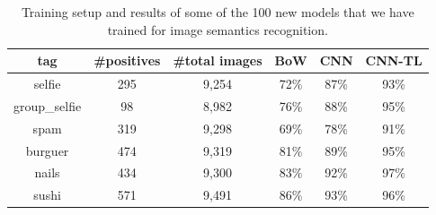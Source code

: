 \documentclass[smallextended]{svjour3}       %
\begin{document}
\begin{table}
\begin{center}\footnotesize 
\begin{tabular}{|c|c|c|c|c|c|}
\hline
tag & \#positives & \#total images & BoW & CNN & CNN-TL \\\hline\hline 
selfie & 295 & 9,254 &  72\% &  87\% &  93\%     \\\hline
group\_selfie & 98 & 8,982 &  76\% &  88\% &  95\%     \\\hline
spam & 319 & 9,298 &  69\% &  78\% &  91\%     \\\hline
burguer & 474 & 9,319 & 81\% &  89\% &  95\%     \\\hline
nails & 434 & 9,300 & 83\% &  92\% &  97\%     \\\hline
sushi & 571 & 9,491 & 86\% &  93\% &  96\%     \\\hline
\end{tabular} 
\end{center}
\caption{\footnotesize Training setup and results of some of the 100 new models that we have trained for image semantics recognition.}
\label{tags_accuracy}
\end{table}
\end{document}

